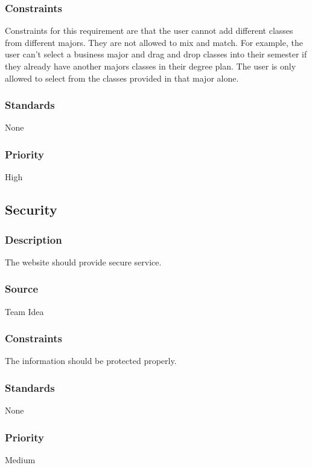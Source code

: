 \subsubsection{Constraints}
Constraints for this requirement are that the user cannot add different classes from different majors. They are not allowed to mix and match. For example, the user can't select a business major and drag and drop classes into their semester if they already have another majors classes in their degree plan. The user is only allowed to select from the classes provided in that major alone.  
\subsubsection{Standards}
None
\subsubsection{Priority}
High

\subsection{Security}
\subsubsection{Description}
The website should provide secure service.
\subsubsection{Source}
Team Idea
\subsubsection{Constraints}
The information should be protected properly.
\subsubsection{Standards}
None
\subsubsection{Priority}
Medium

